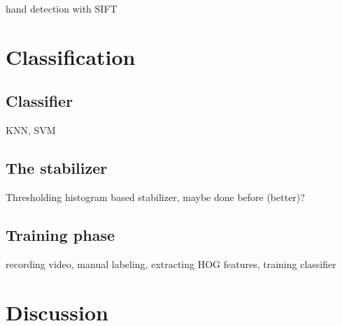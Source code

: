 hand detection with SIFT\cite{Wang_handposture}

\section{Classification}

\subsection*{Classifier}
KNN,  SVM

\subsection*{The stabilizer}
Thresholding histogram based stabilizer, maybe done before (better)?

\subsection*{Training phase}
recording video, manual labeling, extracting HOG features, training classifier

\section{Discussion}